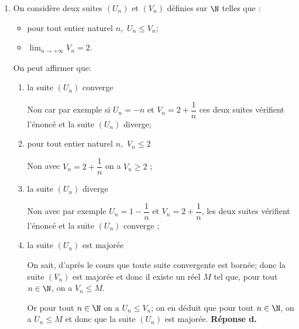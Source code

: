 \begin{enumerate}
$f''(x) = 0 \iff (10x + 25)\text{e}^x = 0 \iff 10x + 25 = 0$ (car $\text{e}^x > 0$ quel que soit $x \in \R$) ; donc 
$f''(x) = 0 \iff x = - 2,5$ : C est donc l'unique point d'inflexion. \hfill \textbf{Réponse c.}

\item On considère deux suites $\left(U_n\right)$ et  $\left(V_n\right)$ définies sur $\N$ telles que : 

\setlength\parindent{1cm}
\begin{itemize}
\item[$\bullet~~$] pour tout entier naturel $n$,\, $U_n \leqslant V_n$;
\item[$\bullet~~$] $\displaystyle\lim_{n \to+ \infty}  V_n= 2$.
\end{itemize}
\setlength\parindent{0cm}

On peut affirmer que:

	\begin{enumerate}
		\item la suite $\left(U_n\right)$ converge
		
		Non car par exemple si $U_n = - n$ et $V_n = 2 + \dfrac{1}{n}$ ces deux suites vérifient l'énoncé et la suite $\left(U_n\right)$ diverge;
		\item pour tout entier naturel $n$,\, $V_n \leqslant 2$ 
		
		Non avec $V_n = 2 + \dfrac{1}{n}$ on a $V_n \geqslant 2$ ;	
		\item la suite $\left(U_n\right)$ diverge
		
		Non avec par exemple $U_n = 1 - \dfrac{1}{n}$ et $V_n = 2 + \dfrac{1}{n}$, les deux suites vérifient l'énoncé et la suite $\left(U_n\right)$ converge ;
		\item la suite $\left(U_n\right)$ est majorée
		
On sait, d'après le cours que toute suite convergente est bornée; donc la suite $(V_n)$ est majorée et donc il existe un réel $M$ tel que, pour tout $n\in\N$, on a $V_n\leqslant	 M$.

Or pour tout $n\in\N$ on a $U_n \leqslant V_n$; on en déduit que pour tout $n\in\N$, on a $U_n\leqslant M$ et donc que la suite $(U_n)$ est majorée. \hfill \textbf{Réponse d.}
		

	\end{enumerate} 
\end{enumerate}
